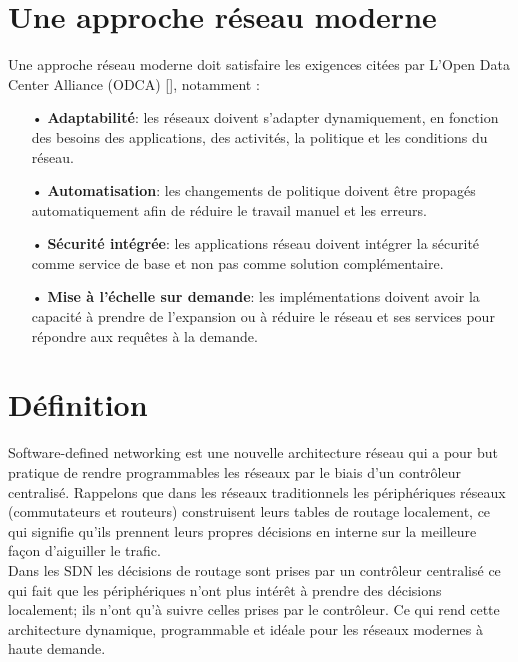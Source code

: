 \newpage
\section{Une approche réseau moderne}
Une approche réseau moderne doit satisfaire les exigences citées par L’Open Data Center Alliance (ODCA)  [\cite{2}], notamment :\\
\begin{itemize}
\item[•] \textbf{Adaptabilité}: les réseaux doivent s’adapter dynamiquement, en fonction des besoins des applications, des activités, la politique et les conditions du réseau.\\
\item[•] \textbf{Automatisation}: les changements de politique doivent être propagés automatiquement afin de réduire le travail manuel et les erreurs.\\
\item[•] \textbf{Sécurité intégrée}: les applications réseau doivent intégrer la sécurité comme service de base et non pas comme solution complémentaire.\\
\item[•] \textbf{Mise à l’échelle sur demande}: les implémentations doivent avoir la capacité à prendre de l’expansion ou à réduire le réseau et ses services pour répondre aux requêtes à la demande.
\end{itemize}


\section{Définition}

Software-defined networking est une nouvelle architecture réseau qui a pour but pratique de rendre programmables les réseaux par le biais d’un contrôleur centralisé. Rappelons que dans les réseaux traditionnels les périphériques réseaux (commutateurs et routeurs) construisent leurs tables de routage localement, ce qui signifie qu’ils prennent leurs propres décisions en interne sur la meilleure façon d’aiguiller le trafic. \\

Dans les SDN les décisions de routage sont prises par un contrôleur centralisé ce qui fait que les périphériques n’ont plus intérêt à prendre des décisions localement; ils n’ont qu’à suivre celles prises par le contrôleur. Ce qui rend cette architecture dynamique, programmable et idéale pour les réseaux modernes à haute demande.

